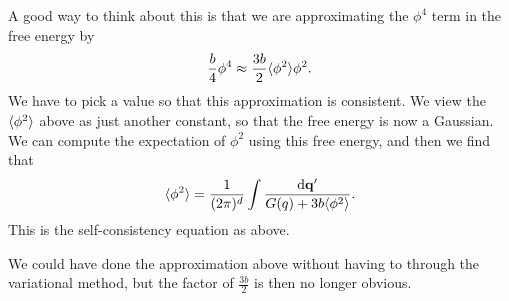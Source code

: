 \documentclass[a4paper]{article}
\begin{document}
A good way to think about this is that we are approximating the $\phi^4$ term in the free energy by
\[
  \frac{b}{4} \phi^4 \approx \frac{3b}{2} \langle \phi^2\rangle \phi^2.
\]
We have to pick a value so that this approximation is consistent. We view the $\langle \phi^2\rangle$ above as just another constant, so that the free energy is now a Gaussian. We can compute the expectation of $\phi^2$ using this free energy, and then we find that
\[
  \langle \phi^2\rangle = \frac{1}{(2\pi)^d} \int \frac{\mathrm{d} \mathbf{q}'}{G(q) + 3b \langle \phi^2\rangle}.
\]
This is the self-consistency equation as above.

We could have done the approximation above without having to through the variational method, but the factor of $\frac{3b}{2}$ is then no longer obvious.

\end{document}
